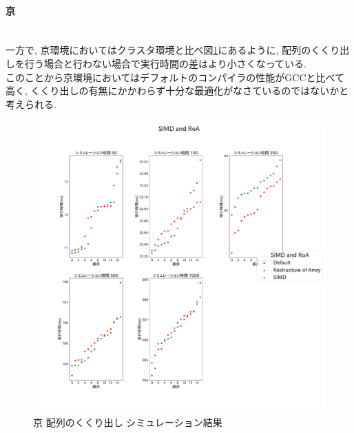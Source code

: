 \paragraph{京}~\\
一方で, 京環境においてはクラスタ環境と比べ図\ref{fig:k-roa}にあるように,
配列のくくり出しを行う場合と行わない場合で実行時間の差はより小さくなっている.\\
このことから京環境においてはデフォルトのコンパイラの性能がGCCと比べて高く,
くくり出しの有無にかかわらず十分な最適化がなさているのではないかと考えられる.\\
\begin{figure}[htb]
\begin{center}
    \includegraphics[width=14cm]{./images/k-SIMD-and-RoA.pdf}
    \caption{京 配列のくくり出し シミュレーション結果}
    \label{fig:k-roa}
\end{center}
\end{figure}
\clearpage

